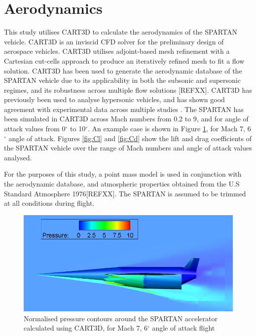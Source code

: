 \documentclass[conf]{new-aiaa}
\begin{document}
\section{Aerodynamics}\label{sec:aero}
 This study utilises CART3D to calculate the aerodynamics of the SPARTAN vehicle\cite{CART3D}. CART3D is an inviscid CFD solver for the preliminary design of aerospace vehicles. CART3D utilises adjoint-based mesh refinement with a Cartesian cut-cells approach to produce an iteratively refined mesh to fit a flow solution\cite{Aftosmis1997}. CART3D has been used to generate the aerodynamic database of the SPARTAN vehicle due to its applicability in both the subsonic and supersonic regimes, and its robustness across multiple flow solutions [REFXX]. CART3D has previously been used to analyse hypersonic vehicles, and has shown good agreement with experimental data across multiple studies \cite{Sagerman2017,Aftosmis2011}. The SPARTAN has been simulated in CART3D across Mach numbers from 0.2 to 9, and for angle of attack values from 0$^\circ$ to 10$^\circ$. An example case is shown in Figure \ref{fig:M7AoA6}, for Mach 7, 6$^\circ$ angle of attack. Figures \ref{fig:Cl} and \ref{fig:Cd} show the lift and drag coefficients of the SPARTAN vehicle over the range of Mach numbers and angle of attack values analysed. 
 
 For the purposes of this study, a point mass model is used in conjunction with the aerodynamic database, and atmospheric properties obtained from the U.S Standard Atmosphere 1976[REFXX]. The SPARTAN is assumed to be trimmed at all conditions during flight.
 
 \begin{figure}
 	\centering
 	\includegraphics[width=0.7\linewidth]{Figures/M7AoA6}
 	\caption{Normalised pressure contours around the SPARTAN accelerator calculated using CART3D, for Mach 7, 6$^\circ$ angle of attack flight}
 	\label{fig:M7AoA6}
 \end{figure}
\end{document}
